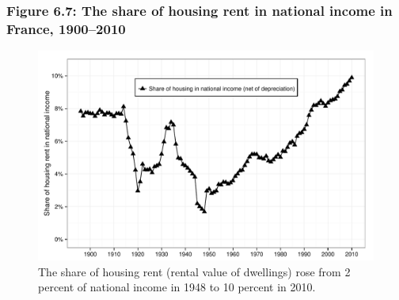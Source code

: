 \documentclass[t]{beamer}\usepackage[]{graphicx}\usepackage[]{color}
\newenvironment{knitrout}{}{} %
\begin{document}
\begin{frame}[label=Figure_6_7]
\frametitle{Figure 6.7: The share of housing rent in national income in France, 1900--2010}
\begin{figure}[t]
\begin{minipage}[b]{\textwidth}
\centering
\begin{knitrout}\footnotesize
{}\color{fgcolor}

{\centering \includegraphics[width=1\linewidth]{figures/bw/Figure_6_7} 

}



\end{knitrout}
\caption{The share of housing rent (rental value of dwellings) rose from 2 percent of national income in 1948 to 10 percent in 2010.}
\end{minipage}
\end{figure}
\end{frame}
\end{document}
